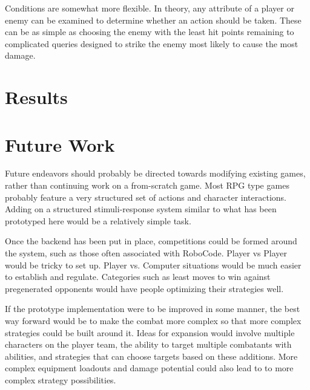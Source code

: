 \documentclass[11pt]{article}
\begin{document}
Conditions are somewhat more flexible.  In theory, any attribute of a player or enemy can be examined to determine whether an action should be taken.  These can be as simple as choosing the enemy with the least hit points remaining to complicated queries designed to strike the enemy most likely to cause the most damage.


\section{Results} 

\section{Future Work}

Future endeavors should probably be directed towards modifying existing games, rather than continuing work on a from-scratch game.  Most RPG type games probably feature a very structured set of actions and character interactions.  Adding on a structured stimuli-response system similar to what has been prototyped here would be a relatively simple task.

Once the backend has been put in place, competitions could be formed around the system, such as those often associated with RoboCode.  Player vs Player would be tricky to set up.  Player vs. Computer situations would be much easier to establish and regulate.  Categories such as least moves to win against pregenerated opponents would have people optimizing their strategies well. 

If the prototype implementation were to be improved in some manner, the best way forward would be to make the combat more complex so that more complex strategies could be built around it.  Ideas for expansion would involve multiple characters on the player team, the ability to target multiple combatants with abilities, and strategies that can choose targets based on these additions. More complex equipment loadouts and damage potential could also lead to to more complex strategy possibilities.
\end{document}
